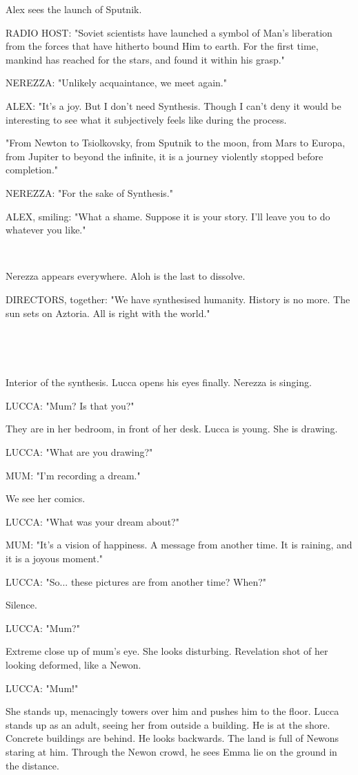 \documentclass[11pt]{article}
\begin{document}
Alex sees the launch of Sputnik.

RADIO HOST: "Soviet scientists have launched a symbol of Man's liberation from the forces that have hitherto bound Him to earth. For the first time, mankind has reached for the stars, and found it within his grasp."

NEREZZA: "Unlikely acquaintance, we meet again."

ALEX: "It's a joy. 
But I don't need Synthesis.
Though I can't deny it would be interesting to see what it subjectively feels like during the process.

"From Newton to Tsiolkovsky, from Sputnik to the moon, from Mars to Europa, from Jupiter to beyond the infinite, it is a journey violently stopped before completion."

NEREZZA: "For the sake of Synthesis."

ALEX, smiling: "What a shame.
Suppose it is your story.
I'll leave you to do whatever you like."

\ 

Nerezza appears everywhere.
Aloh is the last to dissolve.

DIRECTORS, together: "We have synthesised humanity.
History is no more.
The sun sets on Aztoria.
All is right with the world."

\ 

\ 

Interior of the synthesis. 
Lucca opens his eyes finally. 
Nerezza is singing.

LUCCA: "Mum? Is that you?"

They are in her bedroom, in front of her desk.
Lucca is young.
She is drawing. 

LUCCA: "What are you drawing?"

MUM: "I'm recording a dream."

We see her comics.

LUCCA: "What was your dream about?"

MUM: "It's a vision of happiness. 
A message from another time.
It is raining, and it is a joyous moment."

LUCCA: "So... these pictures are from another time?
When?"

Silence.

LUCCA: "Mum?"

Extreme close up of mum's eye.
She looks disturbing.
Revelation shot of her looking deformed, like a Newon.

LUCCA: "Mum!"

She stands up, menacingly towers over him and pushes him to the floor.
Lucca stands up as an adult, seeing her from outside a building.
He is at the shore. 
Concrete buildings are behind.
He looks backwards.
The land is full of Newons staring at him.
Through the Newon crowd, he sees Emma lie on the ground in the distance. 
\end{document}
